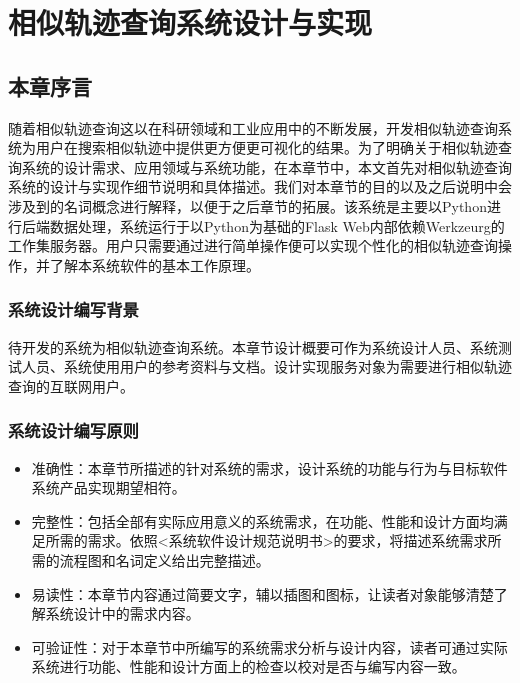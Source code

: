 
\chapter{相似轨迹查询系统设计与实现}
\label{chap:system requirement specification}

\section{本章序言}
\label{sec:introduction}
随着相似轨迹查询这以在科研领域和工业应用中的不断发展，开发相似轨迹查询系统为用户在搜索相似轨迹中提供更方便更可视化的结果。为了明确关于相似轨迹查询系统的设计需求、应用领域与系统功能，在本章节中，本文首先对相似轨迹查询系统的设计与实现作细节说明和具体描述。我们对本章节的目的以及之后说明中会涉及到的名词概念进行解释，以便于之后章节的拓展。该系统是主要以Python进行后端数据处理，系统运行于以Python为基础的Flask Web内部依赖Werkzeurg的工作集服务器。用户只需要通过进行简单操作便可以实现个性化的相似轨迹查询操作，并了解本系统软件的基本工作原理。

\subsection{系统设计编写背景}
\label{subsec:target}
待开发的系统为相似轨迹查询系统。本章节设计概要可作为系统设计人员、系统测试人员、系统使用用户的参考资料与文档。设计实现服务对象为需要进行相似轨迹查询的互联网用户。

\subsection{系统设计编写原则}
\label{subsec:principle}
\begin{itemize}
	\item 准确性：本章节所描述的针对系统的需求，设计系统的功能与行为与目标软件系统产品实现期望相符。
	\item 完整性：包括全部有实际应用意义的系统需求，在功能、性能和设计方面均满足所需的需求。依照<系统软件设计规范说明书>\cite{tuw2002software}的要求，将描述系统需求所需的流程图和名词定义给出完整描述。
	\item 易读性：本章节内容通过简要文字，辅以插图和图标，让读者对象能够清楚了解系统设计中的需求内容。
	\item 可验证性：对于本章节中所编写的系统需求分析与设计内容，读者可通过实际系统进行功能、性能和设计方面上的检查以校对是否与编写内容一致。
\end{itemize}

